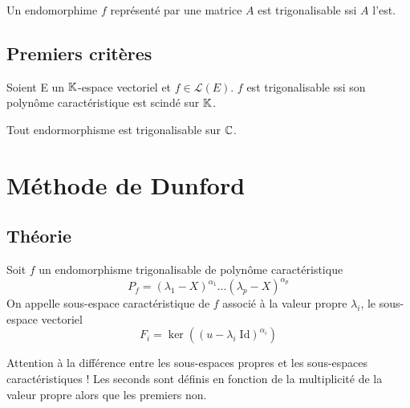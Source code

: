 \begin{prop}
    Un endomorphime $f$ représenté par une matrice $A$ est trigonalisable ssi $A$ l'est. 
\end{prop}

\subsection{Premiers critères}

\begin{criteria}
    Soient E un $\mathbb{K}$-espace vectoriel et $f \in \mathcal{L}(E)$. $f$ est trigonalisable ssi son polynôme caractéristique est scindé sur $\mathbb{K}$. 
\end{criteria}

\begin{corollary}[La puissance de $\C$]
    Tout endormorphisme est trigonalisable sur $\C$. 
\end{corollary}


\section{Méthode de Dunford}

\subsection{Théorie}

\begin{definition}
    Soit $f$ un endomorphisme trigonalisable de polynôme caractéristique 
        $$ P_f = (\lambda_1 - X)^{\alpha_1} \dots (\lambda_p -X)^{\alpha_p} $$ 
    On appelle sous-espace caractéristique de $f$ associé à la valeur propre $\lambda_i$, le sous-espace vectoriel 
        $$ \boxed{ F_i = \ker((u - \lambda_i \; \text{Id})^{\alpha_i}) } $$ 
\end{definition}

\begin{remark}
    Attention à la différence entre les sous-espaces propres et les sous-espaces caractéristiques !
    Les seconds sont définis en fonction de la multiplicité de la valeur propre alors que les premiers non. 
\end{remark}

